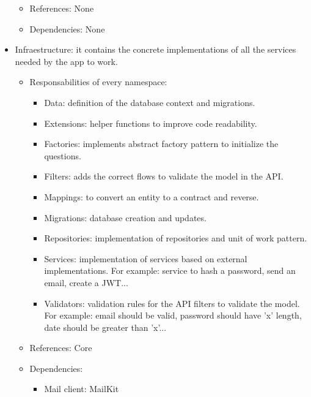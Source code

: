 \begin{itemize}[noitemsep]
\begin{itemize}[noitemsep]
                        \item References: None
                        \item Dependencies: None
                    \end{itemize}
                \item Infraestructure: it contains the concrete implementations of all the services needed by the app to work.
                    \begin{itemize}[noitemsep]
                        \item Responsabilities of every namespace:
                            \begin{itemize}[noitemsep]
                                \item Data: definition of the database context and migrations.
                                \item Extensions: helper functions to improve code readability.
                                \item Factories: implements abstract factory pattern to initialize the questions.
                                \item Filters: adds the correct flows to validate the model in the API.
                                \item Mappings: to convert an entity to a contract and reverse.
                                \item Migrations: database creation and updates.
                                \item Repositories: implementation of repositories and unit of work pattern.
                                \item Services: implementation of services based on external implementations. For example: service to hash a password, send an email, create a JWT...
                                \item Validators: validation rules for the API filters to validate the model. For example: email should be valid, password should have 'x' length, date should be greater than 'x'...
                            \end{itemize}
                        \item References: Core
                        \item Dependencies:
                            \begin{itemize}[noitemsep]
                                \item Mail client: MailKit

\end{itemize}
\end{itemize}
\end{itemize}
